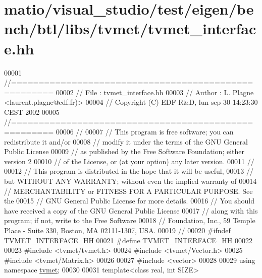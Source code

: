 \hypertarget{matio_2visual__studio_2test_2eigen_2bench_2btl_2libs_2tvmet_2tvmet__interface_8hh_source}{}\section{matio/visual\+\_\+studio/test/eigen/bench/btl/libs/tvmet/tvmet\+\_\+interface.hh}
\label{matio_2visual__studio_2test_2eigen_2bench_2btl_2libs_2tvmet_2tvmet__interface_8hh_source}

\begin{DoxyCode}
00001 \textcolor{comment}{//=====================================================}
00002 \textcolor{comment}{// File   :  tvmet\_interface.hh}
00003 \textcolor{comment}{// Author :  L. Plagne <laurent.plagne@edf.fr)>}
00004 \textcolor{comment}{// Copyright (C) EDF R&D,  lun sep 30 14:23:30 CEST 2002}
00005 \textcolor{comment}{//=====================================================}
00006 \textcolor{comment}{//}
00007 \textcolor{comment}{// This program is free software; you can redistribute it and/or}
00008 \textcolor{comment}{// modify it under the terms of the GNU General Public License}
00009 \textcolor{comment}{// as published by the Free Software Foundation; either version 2}
00010 \textcolor{comment}{// of the License, or (at your option) any later version.}
00011 \textcolor{comment}{//}
00012 \textcolor{comment}{// This program is distributed in the hope that it will be useful,}
00013 \textcolor{comment}{// but WITHOUT ANY WARRANTY; without even the implied warranty of}
00014 \textcolor{comment}{// MERCHANTABILITY or FITNESS FOR A PARTICULAR PURPOSE.  See the}
00015 \textcolor{comment}{// GNU General Public License for more details.}
00016 \textcolor{comment}{// You should have received a copy of the GNU General Public License}
00017 \textcolor{comment}{// along with this program; if not, write to the Free Software}
00018 \textcolor{comment}{// Foundation, Inc., 59 Temple Place - Suite 330, Boston, MA  02111-1307, USA.}
00019 \textcolor{comment}{//}
00020 \textcolor{preprocessor}{#ifndef TVMET\_INTERFACE\_HH}
00021 \textcolor{preprocessor}{#define TVMET\_INTERFACE\_HH}
00022 
00023 \textcolor{preprocessor}{#include <tvmet/tvmet.h>}
00024 \textcolor{preprocessor}{#include <tvmet/Vector.h>}
00025 \textcolor{preprocessor}{#include <tvmet/Matrix.h>}
00026 
00027 \textcolor{preprocessor}{#include <vector>}
00028 
00029 \textcolor{keyword}{using namespace }\hyperlink{namespacetvmet}{tvmet};
00030 
00031 \textcolor{keyword}{template}<\textcolor{keyword}{class} real, \textcolor{keywordtype}{int} SIZE>

\end{DoxyCode}
